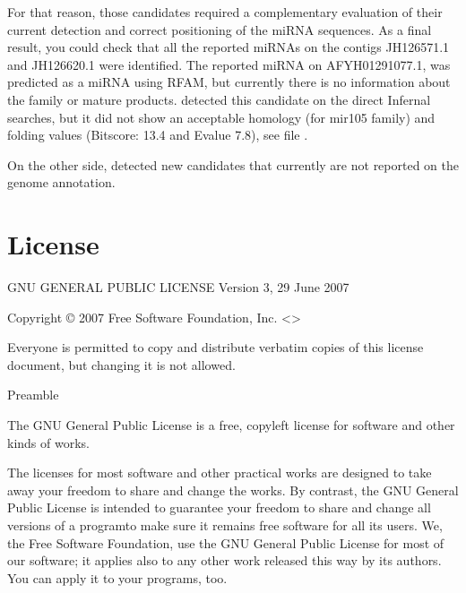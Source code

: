 \documentclass[letterpaper,10pt,english]{sphinxmanual}
\let\sphinxpxdimen\pdfpxdimen\else\newdimen\sphinxpxdimen
\begin{document}
\begin{figure}[htbp]
\centering

\noindent\sphinxincludegraphics[width=600\sphinxpxdimen,height=99\sphinxpxdimen]{{secondTwo}.png}
\end{figure}

For that reason, those candidates required a complementary evaluation of their current detection and correct positioning of the  miRNA sequences.
As a final result, you could check that all the reported miRNAs on the contigs
JH126571.1 and JH126620.1 were identified. The reported miRNA on AFYH01291077.1,
was predicted as a miRNA using RFAM, but currently there is no information about
the family or mature products.  detected this candidate on the
direct Infernal searches, but it did not show an acceptable homology (for
mir\sphinxhyphen{}105 family) and folding values (Bitscore: 13.4 and E\sphinxhyphen{}value 7.8), see file
.

On the other side,  detected new candidates that currently are not
reported on the genome annotation.


\section{License}
\label{\detokenize{license:license}}\label{\detokenize{license::doc}}
GNU GENERAL PUBLIC LICENSE
Version 3, 29 June 2007

Copyright © 2007 Free Software Foundation, Inc. \textless{}\textgreater{}

Everyone is permitted to copy and distribute verbatim copies of this license document, but changing it is not allowed.

Preamble

The GNU General Public License is a free, copyleft license for software and other kinds of works.

The licenses for most software and other practical works are designed to take away your freedom to share and change the works. By contrast, the GNU General Public License is intended to guarantee your freedom to share and change all versions of a program\textendash{}to make sure it remains free software for all its users. We, the Free Software Foundation, use the GNU General Public License for most of our software; it applies also to any other work released this way by its authors. You can apply it to your programs, too.
\end{document}
